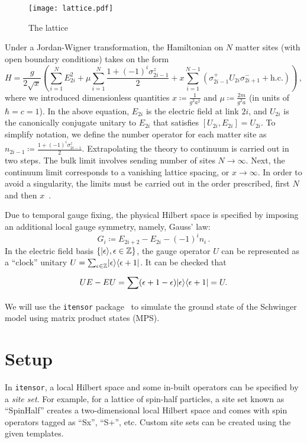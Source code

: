 \documentclass[aps,prl,reprint,superscriptaddress, onecolumn, 11pt]{revtex4-2}
\newcommand{\paren}[1]{\left(#1\right)}
\newcommand{\curly}[1]{\left\{#1\right\}}
\newcommand{\suml}[3]{\sum_{#1}^{#2}#3}
\newcommand{\pz}[1]{\sigma^{z}_{#1}}
\newcommand{\pplus}[1]{\sigma^{+}_{#1}}
\newcommand{\pminus}[1]{\sigma^{-}_{#1}}
\newcommand{\iten}[0]{\texttt{itensor}}
\DeclarePairedDelimiter\bra{\langle}{\vert}
\DeclarePairedDelimiter\ket{\vert}{\rangle}
\theoremstyle{definition}
\theoremstyle{definition}
\begin{document}
\begin{figure}[h]
  \centering
  \texttt{[image: lattice.pdf]}
  \caption{The lattice}
  \label{fig:lattice}
\end{figure}
Under a Jordan-Wigner transformation, the Hamiltonian on $N$ matter sites (with open boundary conditions) takes on the form
\begin{equation}
  \label{eq:schwingerH}
  H = \frac{g}{2\sqrt{x}}\paren{\suml{i=1}{N}{E_{2i}^2} + \mu\suml{i=1}{N}{\frac{1 + (-1)^i\pz{2i-1}}{2}} + x\suml{i=1}{N-1}{\paren{\pplus{2i-1} U_{2i} \pminus{2i+1} +\mathrm{ h.c.}}}}\, ,
\end{equation}
where we introduced dimensionless quantities $x \coloneqq \frac{1}{g^2a^2}$ and $\mu\coloneqq \frac{2m}{g^2a}$ (in units of  $\hbar = c = 1$). In the above equation, $E_{2i}$ is the electric field at link $2i$, and $U_{2i}$ is the canonically conjugate unitary to $E_{2i}$ that satisfies $[U_{2i}, E_{2i}] = U_{2i}$. To simplify notation, we define the number operator for each matter site as $n_{2i-1}\coloneqq \frac{1 + (-1)^i\pz{2i-1}}{2}$. Extrapolating the theory to continuum is carried out in two steps. The bulk limit involves sending number of sites $N\rightarrow\infty$. Next, the continuum limit corresponds to a vanishing lattice spacing, or $x\rightarrow \infty$. In order to avoid a singularity, the limits must be carried out in the order prescribed, first $N$ and then $x$~\cite{byrnes2003, hamer1982}. 

Due to temporal gauge fixing, the physical Hilbert space is specified by imposing an additional local gauge symmetry, namely, Gauss' law:
\begin{equation}
  \label{eq:gaussLaw}
  G_i \coloneqq E_{2i+2} - E_{2i} - (-1)^in_i\, .
\end{equation}
In the electric field basis $\curly{\ket{\epsilon}, \epsilon\in\mathbb{Z}}$, the gauge operator $U$ can be represented as a ``clock'' unitary $U = \suml{\epsilon\in\mathbb{Z}}{}{\ket{\epsilon}\bra{\epsilon+1}}$. It can be checked that
\begin{equation}
  \label{eq:commutationcheck}
  UE - EU = \suml{}{}{(\epsilon+1-\epsilon)\ket{\epsilon}\bra{\epsilon+1}} = U.
\end{equation}
We will use the \iten{} package~\cite{itensor} to simulate the ground state of the Schwinger model using matrix product states (MPS).

\section{Setup}
\label{sec:setup}
In \iten{}, a local Hilbert space and some in-built operators can be specified by a \emph{site set}. For example, for a lattice of spin-half particles, a site set known as ``SpinHalf'' creates a two-dimensional local Hilbert space and comes with spin operators tagged as ``Sx'', ``S+'', etc. Custom site sets can be created using the given templates.
\end{document}
